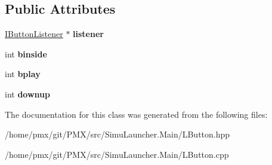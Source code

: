 \subsection*{Public Attributes}
\begin{DoxyCompactItemize}
\item 
\mbox{\label{classLButton_a8cfef25b1e0b359bf4d17be0574ffee4}} 
\hyperlink{classIButtonListener}{I\+Button\+Listener} $\ast$ {\bfseries listener}
\item 
\mbox{\label{classLButton_af2f51d9a240f9f7b7ad8615272d0ac83}} 
int {\bfseries binside}
\item 
\mbox{\label{classLButton_ae654a641f9e5fddae3803f361757c508}} 
int {\bfseries bplay}
\item 
\mbox{\label{classLButton_a85d2a18079f362e331824b136ed1d1b2}} 
int {\bfseries downup}
\end{DoxyCompactItemize}


The documentation for this class was generated from the following files\+:\begin{DoxyCompactItemize}
\item 
/home/pmx/git/\+P\+M\+X/src/\+Simu\+Launcher.\+Main/L\+Button.\+hpp\item 
/home/pmx/git/\+P\+M\+X/src/\+Simu\+Launcher.\+Main/L\+Button.\+cpp\end{DoxyCompactItemize}

